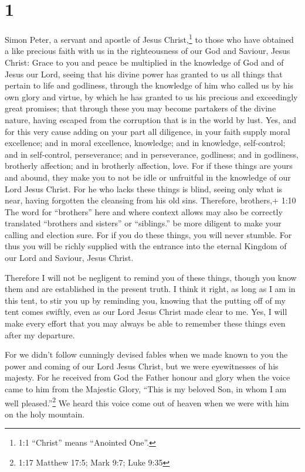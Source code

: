 \hypertarget{section}{%
\section{1}\label{section}}

 Simon Peter, a servant and apostle of Jesus
Christ,\footnote{1:1 ``Christ'' means ``Anointed One''.} to those who
have obtained a like precious faith with us in the righteousness of our
God and Saviour, Jesus Christ:  Grace to you and peace be
multiplied in the knowledge of God and of Jesus our Lord, 
seeing that his divine power has granted to us all things that pertain
to life and godliness, through the knowledge of him who called us by his
own glory and virtue,  by which he has granted to us his
precious and exceedingly great promises; that through these you may
become partakers of the divine nature, having escaped from the
corruption that is in the world by lust.  Yes, and for this
very cause adding on your part all diligence, in your faith supply moral
excellence; and in moral excellence, knowledge;  and in
knowledge, self-control; and in self-control, perseverance; and in
perseverance, godliness;  and in godliness, brotherly
affection; and in brotherly affection, love.  For if these
things are yours and abound, they make you to not be idle or unfruitful
in the knowledge of our Lord Jesus Christ.  For he who lacks
these things is blind, seeing only what is near, having forgotten the
cleansing from his old sins.  Therefore, brothers,+ 1:10
The word for ``brothers'' here and where context allows may also be
correctly translated ``brothers and sisters'' or ``siblings.'' be more
diligent to make your calling and election sure. For if you do these
things, you will never stumble.  For thus you will be
richly supplied with the entrance into the eternal Kingdom of our Lord
and Saviour, Jesus Christ.

 Therefore I will not be negligent to remind you of these
things, though you know them and are established in the present truth.
 I think it right, as long as I am in this tent, to stir
you up by reminding you,  knowing that the putting off of
my tent comes swiftly, even as our Lord Jesus Christ made clear to me.
 Yes, I will make every effort that you may always be able
to remember these things even after my departure.

 For we didn't follow cunningly devised fables when we made
known to you the power and coming of our Lord Jesus Christ, but we were
eyewitnesses of his majesty.  For he received from God the
Father honour and glory when the voice came to him from the Majestic
Glory, ``This is my beloved Son, in whom I am well pleased.''\footnote{1:17
  Matthew 17:5; Mark 9:7; Luke 9:35}  We heard this voice
come out of heaven when we were with him on the holy mountain.

